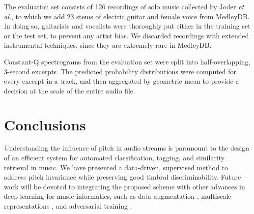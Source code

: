 \documentclass{article}
\makeatletter
\newcommand*{\etal}{\emph{et al.}\@\xspace}
\makeatother
\begin{document}
The evaluation set consists of 126 recordings of solo music collected by
Joder \etal \cite{Joder2009}, to which we add 23 stems of electric guitar and female voice
from MedleyDB.
In doing so, guitarists and vocalists were thoroughly put either in the training set or the test set,
to prevent any artist bias.
We discarded recordings with extended instrumental techniques, since they are
extremely rare in MedleyDB.

Constant-Q spectrograms from the evaluation set were split into half-overlapping,
3-second excerpts.
The predicted probability distributions were computed for every excerpt in a track,
and then aggregated by geometric mean to provide a decision at the scale of
the entire audio file.

\section{Conclusions}
Understanding the influence of pitch in audio streams is paramount to the design of
an efficient system for automated classification, tagging, and similarity retrieval in music. 
We have presented a data-driven, supervised method to address pitch invariance
while preserving good timbral discriminability.
Future work will be devoted to integrating the proposed scheme with other advances
in deep learning for music informatics, such as data augmentation \cite{McFee2015-muda},
multiscale representations \cite{Hamel2012, Anden2015},
and adversarial training \cite{Kereliuk2015}.

\end{document}
